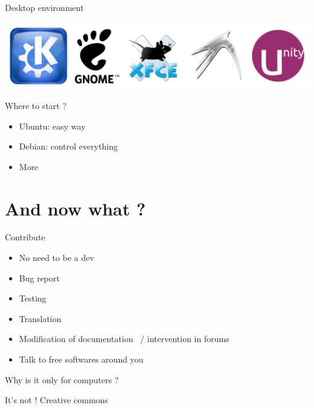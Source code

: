 \documentclass[xcolor={usenames,dvipsnames}]{beamer}
\newcommand{\sectiontitle}{}
\newcommand{\newsection}[1]{\renewcommand{\sectiontitle}{#1}\section{#1}}
\begin{document}
\begin{frame}{Desktop environment}
    \begin{centering}
        \includegraphics[width=.9\textwidth]{logo-Linux_environnements}
    \end{centering}
\end{frame}

\begin{frame}{Where to start ?}
    \begin{itemize}
        \item Ubuntu: easy way
        \item  Debian: control everything
        \item More~\cite{DistroWiki,DistroList}
    \end{itemize}
\end{frame}
\newsection{And now what ?}

\begin{frame}{Contribute}
    \begin{itemize}
        \item No need to be a dev
        \item Bug report
        \item Testing
        \item Translation
        \item Modification of documentation~\cite{ubdoc} / intervention in forums~\cite{ubforum}
        \item Talk to free softwares around you
    \end{itemize}
\end{frame}

\begin{frame}{Why is it only for computers ?}
    \begin{block}{It's not !}
        Creative commons~\cite{CC,CCWiki,DeviantArt}
    \end{block}
\end{frame}
\end{document}
